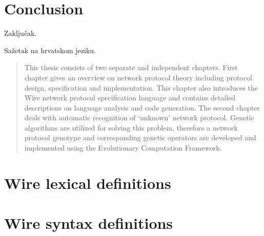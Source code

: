 \documentclass[times, utf8, diplomski]{fer}
\begin{document}
\section{}

\chapter{Conclusion}
Zaključak.




\begin{sazetak}
Sažetak na hrvatskom jeziku.

\end{sazetak}

\begin{abstract}
This thesis consists of two separate and independent chapters. First chapter gives
an overview on network protocol theory including protocol design, specification
and implementation. This chapter also introduces the Wire network protocol 
specification language and contains detailed descriptions on language analysis
and code generation. The second chapter deals with automatic recognition of
`unknown' network protocol. Genetic algorithms are utilized for solving this
problem, therefore a network protocol genotype and corresponding genetic operators 
are developed and implemented using the Evolutionary Computation Framework.

\end{abstract}

\appendix
\chapter{Wire lexical definitions}
\lstset{language=C}
\lstset{basicstyle=\tiny}
\lstset{numbers=left, numberstyle=\tiny, stepnumber=1, numbersep=5pt}


\chapter{Wire syntax definitions}
\lstset{language=C}
\lstset{basicstyle=\tiny}
\lstset{numbers=left, numberstyle=\tiny, stepnumber=1, numbersep=5pt}

\end{document}
